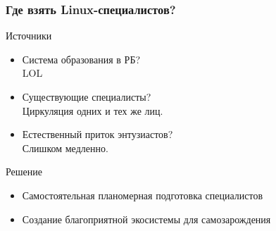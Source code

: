 \begin{frame}
	\frametitle{Где взять Linux-специалистов?}

	\begin{block}{Источники}
		\begin{itemize}
			\item Система образования в РБ? \\
				LOL
				\pause
			\item Существующие специалисты? \\
				Циркуляция одних и тех же лиц.
				\pause
			\item Естественный приток энтузиастов? \\
				Слишком медленно.
		\end{itemize}
	\end{block}

	\begin{block}{Решение}
		\begin{itemize}
			\item Самостоятельная планомерная подготовка специалистов
			\item Создание благоприятной экосистемы для самозарождения
		\end{itemize}
	\end{block}
\end{frame}

